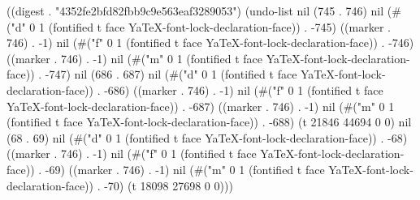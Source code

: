 
((digest . "4352fe2bfd82fbb9c9e563eaf3289053") (undo-list nil (745 . 746) nil (#("d" 0 1 (fontified t face YaTeX-font-lock-declaration-face)) . -745) ((marker . 746) . -1) nil (#("f" 0 1 (fontified t face YaTeX-font-lock-declaration-face)) . -746) ((marker . 746) . -1) nil (#("m" 0 1 (fontified t face YaTeX-font-lock-declaration-face)) . -747) nil (686 . 687) nil (#("d" 0 1 (fontified t face YaTeX-font-lock-declaration-face)) . -686) ((marker . 746) . -1) nil (#("f" 0 1 (fontified t face YaTeX-font-lock-declaration-face)) . -687) ((marker . 746) . -1) nil (#("m" 0 1 (fontified t face YaTeX-font-lock-declaration-face)) . -688) (t 21846 44694 0 0) nil (68 . 69) nil (#("d" 0 1 (fontified t face YaTeX-font-lock-declaration-face)) . -68) ((marker . 746) . -1) nil (#("f" 0 1 (fontified t face YaTeX-font-lock-declaration-face)) . -69) ((marker . 746) . -1) nil (#("m" 0 1 (fontified t face YaTeX-font-lock-declaration-face)) . -70) (t 18098 27698 0 0)))
